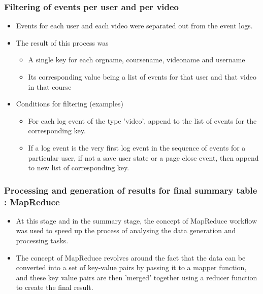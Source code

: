 \documentclass[12pt,xcolor=dvipsnames]{beamer}
\begin{document}

\begin{frame}[t]
\frametitle{Filtering of events per user and per video}
\vfill
\begin{itemize}

\item Events for each user and each video were separated out from the event logs.
\item The result of this process was

\begin{itemize}
\item A single key for each orgname, coursename, videoname and username
\item Its corresponding value being a list of events for that user and that video in that course

\end{itemize}

\item Conditions for filtering (examples)

\begin{itemize}

\item For each log event of the type ’video’, append to the list of events for the corresponding key.

\item If a log event is the very first log event in the sequence of events for a particular user, if not a save user state or a page close event, then append to new list of corresponding key.

\end{itemize}

\end{itemize}

\end{frame}


\begin{frame}[t]
\frametitle{Processing and generation of results for final summary table : MapReduce}
\vfill
\begin{itemize}

\item At this stage and in the summary stage, the concept of
MapReduce workflow was used to speed up the process of analysing the data generation and processing
tasks.

\item The concept of MapReduce revolves around the fact that the data can be converted into a set of
key-value pairs by passing it to a mapper function, and these key value pairs are then ’merged’ together
using a reducer function to create the final result.


\end{itemize}
\end{frame}
\end{document}
